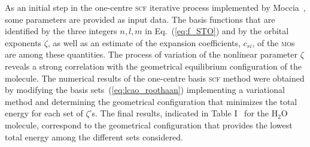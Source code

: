 
As an initial step in the one-centre \textsc{scf} iterative process
implemented by
Moccia~\cite{Moccia_JCP_2164,Moccia_JCP_2176,Moccia_1964}, some
parameters are provided as input data. The basis functions that are
identified by the three integers $n,l,m$ in Eq.~(\ref{eq:f_STO}) and
by the orbital exponents $\zeta$, as well as an estimate of the
expansion coefficients, $c_{si}$, of the \textsc{mo}s are among
these quantities. The process of variation of the nonlinear parameter
$\zeta$ reveals a strong correlation with the geometrical equilibrium
configuration of the molecule. The numerical results of the one-centre
basis \textsc{scf} method were obtained by modifying the basis
sets~(\ref{eq:lcao_roothaan}) implementing a variational method and
determining the geometrical configuration that minimizes the total
energy for each set of $\zeta$'s. The final results, indicated in
Table I~\cite{Moccia_1964} for the H$_{2}$O molecule, correspond to
the geometrical configuration that provides the lowest total energy
among the different sets considered.









